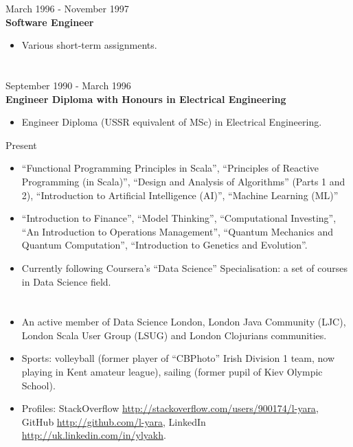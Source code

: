 \documentclass{res}
\newcommand{\osection}[1]{\section{\sc {\Large \textbf{#1}\\}} \vspace{0.30cm}}
\begin{document}
\begin{resume}
 \hfill        March 1996 - November 1997\\
{\bf Software Engineer}
\begin{itemize} \itemsep -2pt %
 \item Various short-term assignments.
\end{itemize}

\osection{EDUCATION}
 \hfill        September 1990 - March 1996\\
{\bf Engineer Diploma with Honours in Electrical Engineering}
\begin{itemize} \itemsep -2pt %
 \item Engineer Diploma (USSR equivalent of MSc) in Electrical Engineering.
\end{itemize}
 \hfill        Present
\begin{itemize} \itemsep -2pt %
 \item ``Functional Programming Principles in Scala'', ``Principles of Reactive Programming (in Scala)'', ``Design and Analysis of Algorithms'' (Parts 1 and 2), ``Introduction to Artificial Intelligence (AI)'', ``Machine Learning (ML)''
 \item ``Introduction to Finance'', ``Model Thinking'', ``Computational Investing'', ``An Introduction to Operations Management'', ``Quantum Mechanics and Quantum Computation'', ``Introduction to Genetics and Evolution''.
 \item Currently following Coursera’s ``Data Science'' Specialisation: a set of courses in Data Science field.
\end{itemize}

\osection{SPECIALS}
\begin{itemize}
 \item An active member of Data Science London, London Java Community (LJC), London Scala User Group (LSUG) and London Clojurians communities.
 \item Sports: volleyball (former player of ``CBPhoto'' Irish Division 1 team, now playing in Kent amateur league), sailing (former pupil of Kiev Olympic School).
 \item Profiles: StackOverflow \url{http://stackoverflow.com/users/900174/l-yara}, GitHub \url{http://github.com/l-yara}, LinkedIn \url{http://uk.linkedin.com/in/ylyakh}.
\end{itemize}


\end{resume}
\end{document}
